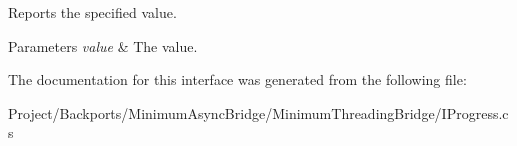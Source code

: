Reports the specified value. 


\begin{DoxyParams}{Parameters}
{\em value} & The value.\\
\hline
\end{DoxyParams}


The documentation for this interface was generated from the following file\+:\begin{DoxyCompactItemize}
\item 
Project/\+Backports/\+Minimum\+Async\+Bridge/\+Minimum\+Threading\+Bridge/I\+Progress.\+cs\end{DoxyCompactItemize}
